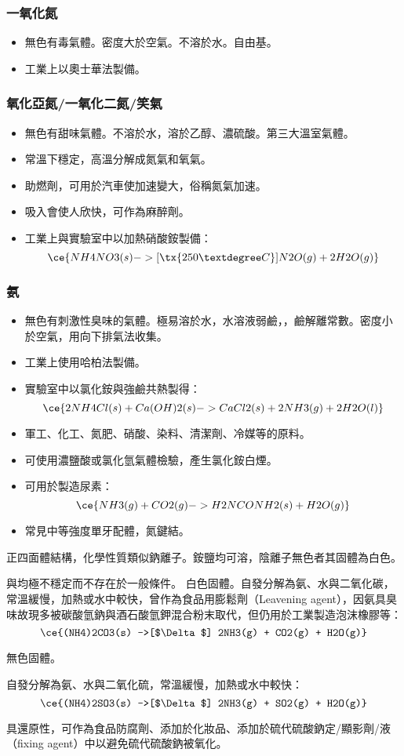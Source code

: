 \documentclass[a4paper,12pt]{report}
\begin{document}
\subsubsection{一氧化氮}
\begin{itemize}
\item 無色有毒氣體。密度大於空氣。不溶於水。自由基。
\item 工業上以奧士華法製備。
\end{itemize}
\subsubsection{氧化亞氮/一氧化二氮/笑氣}
\begin{itemize}
\item 無色有甜味氣體。不溶於水，溶於乙醇、濃硫酸。第三大溫室氣體。
\item 常溫下穩定，高溫分解成氮氣和氧氣。
\item 助燃劑，可用於汽車使加速變大，俗稱氮氣加速。
\item 吸入會使人欣快，可作為麻醉劑。
\item 工業上與實驗室中以加熱硝酸銨製備：
\[\ce{NH4NO3(s) ->[\tx{250°C}] N2O(g) + 2H2O(g)}\]
\end{itemize}
\subsubsection{氨}
\begin{itemize}
\item 無色有刺激性臭味的氣體。極易溶於水，水溶液弱鹼，，鹼解離常數。密度小於空氣，用向下排氣法收集。
\item 工業上使用哈柏法製備。
\item 實驗室中以氯化銨與強鹼共熱製得：
\[\ce{2NH4Cl(s) + Ca(OH)2(s) -> CaCl2(s) + 2NH3(g) + 2H2O(l)}\]
\item 軍工、化工、氮肥、硝酸、染料、清潔劑、冷媒等的原料。
\item 可使用濃鹽酸或氯化氫氣體檢驗，產生氯化銨白煙。
\item 可用於製造尿素：
\[\ce{NH3(g) + CO2(g) -> H2NCONH2(s) + H2O(g)}\]
\item 常見中等強度單牙配體，氮鍵結。
\end{itemize}
\bit
\item 正四面體結構，化學性質類似鈉離子。銨鹽均可溶，陰離子無色者其固體為白色。
\item {}與均極不穩定而不存在於一般條件。
\eit
{}
白色固體。自發分解為氨、水與二氧化碳，常溫緩慢，加熱或水中較快，曾作為食品用膨鬆劑（Leavening agent），因氨具臭味故現多被碳酸氫鈉與酒石酸氫鉀混合粉末取代，但仍用於工業製造泡沫橡膠等：
\[\ce{(NH4)2CO3(s) ->[$\Delta$] 2NH3(g) + CO2(g) + H2O(g)}\]
\bit
\item 無色固體。
\item 自發分解為氨、水與二氧化硫，常溫緩慢，加熱或水中較快：
\[\ce{(NH4)2SO3(s) ->[$\Delta$] 2NH3(g) + SO2(g) + H2O(g)}\]
\item 具還原性，可作為食品防腐劑、添加於化妝品、添加於硫代硫酸鈉定/顯影劑/液（fixing agent）中以避免硫代硫酸鈉被氧化。
\eit
\end{document}
